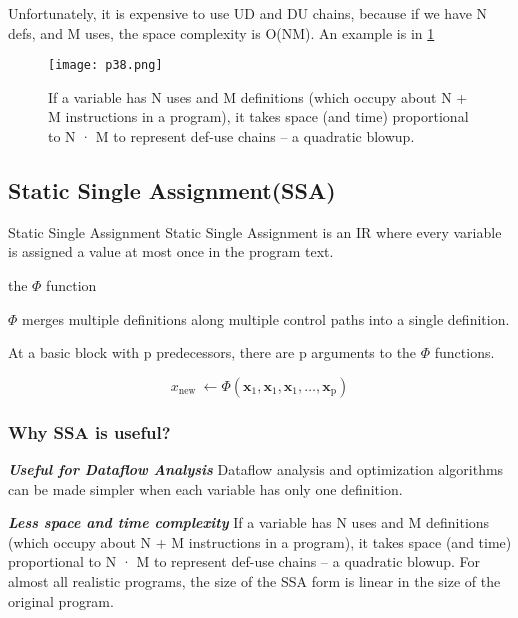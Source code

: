 Unfortunately, it is expensive to use UD and DU chains, because if we have N defs, and M uses, the space complexity is O(NM). An example is in \ref{fig:p38}


\begin{figure}[htb]
	\centering
	\texttt{[image: p38.png]}
	\caption{If a variable has N uses and M definitions (which occupy about N + M instructions in a program), it takes space (and time) proportional to N · M to represent def-use chains – a quadratic blowup.}
	\label{fig:p38}
\end{figure}


\subsection{Static Single Assignment(SSA)}

\begin{definition}{Static Single Assignment }
	Static Single Assignment is an IR where every variable is assigned a value at most once in the program text.
\end{definition}








\begin{definition}{the $\Phi$ function}

	$\Phi$ merges multiple definitions along multiple control paths into a single definition.

	At a basic block with p predecessors, there are p arguments to the $\Phi$ functions.

	$$ x_{\text {new }} \leftarrow \Phi\left(\mathbf{x}_1, \mathbf{x}_1, \mathbf{x}_1, \ldots, \mathbf{x}_{\mathrm{p}}\right)
	$$
\end{definition}

\subsubsection{Why SSA is useful?}

\textbf{ \large \textit{Useful for Dataflow Analysis}} Dataflow analysis and optimization algorithms can be made simpler when each variable has only one definition.

\textbf{ \large \textit{Less space and time complexity}} If a variable has N uses and M definitions (which occupy about N + M instructions in a program), it takes space (and time) proportional to N · M to represent def-use chains – a quadratic blowup. For almost all realistic programs, the size of the SSA form is linear in the size of the original program.


